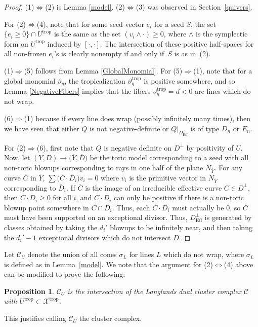 \documentclass[pdftex]{sigma}
\numberwithin{equation}{section}
\numberwithin{figure}{section}
\numberwithin{table}{section}
\DeclareMathOperator{\trop}{trop}
\DeclareMathOperator{\Eff}{Eff}
\let\?=\overline
\let\rar=\rightarrow
\let\s=\mathcal
\newtheorem{prop}[thm]{Proposition}
\theoremstyle{definition}
\begin{document}
\begin{proof}(1)$\Leftrightarrow$(2) is Lemma \ref{model}. (2)$\Leftrightarrow$(3) was observed in Section~\ref{quivers}.

For (2)$\Leftrightarrow$(4), note that for some seed vector $e_i$ for a seed $S$, the set $\{e_i\geq 0\}\cap U^{\trop}$ is the same as the set $(v_i\wedge \cdot) \geq 0$, where $\wedge$ is the symplectic form on $U^{\trop}$ induced by $[ \cdot,\cdot]$. The intersection of these positive half-spaces for all non-frozen $e_i$'s is clearly nonempty if and only if~$S$ is as in~(2).

 (1)$\Rightarrow$(5) follows from Lemma \ref{GlobalMonomial}. For (5)$\Rightarrow$(1), note that for a global monomial $\vartheta_q$, the tropicalization $\vartheta_q^{\trop}$ is positive somewhere, and so Lemma \ref{NegativeFibers} implies that the fibers $\vartheta_q^{\trop}=d<0$ are lines which do not wrap.

 (6)$\Rightarrow$(1) because if every line does wrap (possibly infinitely many times), then we have seen that either $Q$ is not negative-definite or $Q|_{D^{\perp}_{\Eff}}$ is of type $D_n$ or $E_n$.

 For (2)$\Rightarrow$(6), first note that $Q$ is negative definite on $D^{\perp}$ by positivity of $U$. Now, let $(Y,D)\rar \big(\?{Y},\?{D}\big)$ be the toric model corresponding to a seed with all non-toric blowups corresponding to rays in one half of the plane $N_{\?{Y}}$. For any curve $\?{C}$ in $\?{Y}$, $\sum \big(\?{C}\cdot \?{D}_i\big) v_i=0$ where $v_i$ is the primitive vector in $N_{\?{Y}}$ corresponding to $\?{D}_i$. If $\?{C}$ is the image of an irreducible effective curve $C\in D^{\perp}$, then $\?{C}\cdot \?{D}_i \geq 0$ for all $i$, and $\?{C}\cdot \?{D}_i$ can only be positive if there is a non-toric blowup point somewhere in $\?{C} \cap \?{D}_i$. Thus, each $\?{C}\cdot \?{D}_i$ must actually be $0$, so $C$ must have been supported on an exceptional divisor. Thus, $D^{\perp}_{\Eff}$ is generated by classes obtained by taking the $d_i'$ blowups to be infinitely near, and then taking the $d_i'-1$ exceptional divisors which do not intersect $D$.
\end{proof}

Let $\s{C}_U$ denote the union of all cones $\sigma_L$ for lines $L$ which do not wrap, where $\sigma_L$ is defined as in Lemma~\ref{model}. We note that the argument for (2)$\Leftrightarrow$(4) above can be modified to prove the following:
\begin{prop} $\s{C}_U$ is the intersection of the Langlands dual cluster complex $\s{C}$ with $U^{\trop}\subset \s{X}^{\trop}$.
\end{prop}
This justifies \cite{Man1} calling $\s{C}_U$ the cluster complex.
\end{document}
